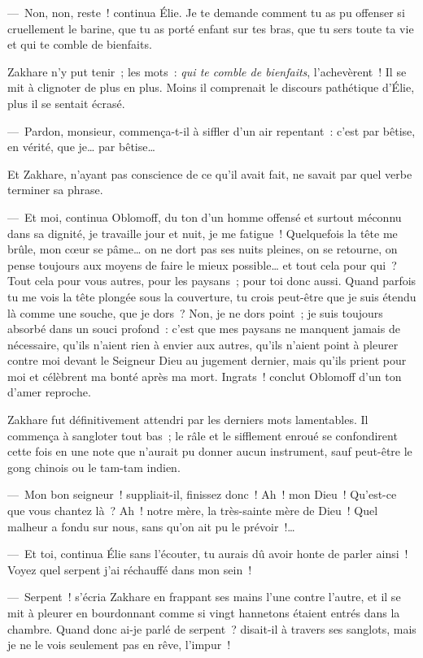 \documentclass[french,twoside]{book} %
\begin{document}
— Non, non, reste ! continua Élie. Je te demande comment tu as pu offenser si cruellement le barine, que tu as porté enfant sur tes bras, que tu sers toute ta vie et qui te comble de bienfaits.\par
Zakhare n’y put tenir ; les mots : \emph{qui te comble de bienfaits}, l’achevèrent ! Il se mit à clignoter de plus en plus. Moins il comprenait le discours pathétique d’Élie, plus il se sentait écrasé.\par
— Pardon, monsieur, commença-t-il à siffler d’un air repentant : c’est par bêtise, en vérité, que je… par bêtise…\par
Et Zakhare, n’ayant pas conscience de ce qu’il avait fait, ne savait par quel verbe terminer sa phrase.\par
— Et moi, continua Oblomoff, du ton d’un homme offensé et surtout méconnu dans sa dignité, je travaille jour et nuit, je me fatigue ! Quelquefois la tête me brûle, mon cœur se pâme… on ne dort pas ses nuits pleines, on se retourne, on pense toujours aux moyens de faire le mieux possible… et tout cela pour qui ? Tout cela pour vous autres, pour les paysans ; pour toi donc aussi. Quand parfois tu me vois la tête plongée sous la couverture, tu crois peut-être que je suis étendu là comme une souche, que je dors ? Non, je ne dors point ; je suis toujours absorbé dans un souci profond : c’est que mes paysans ne manquent jamais de nécessaire, qu’ils n’aient rien à envier aux autres, qu’ils n’aient point à pleurer contre moi devant le Seigneur Dieu au jugement dernier, mais qu’ils prient pour moi et célèbrent ma bonté après ma mort. Ingrats ! conclut Oblomoff d’un ton d’amer reproche.\par
Zakhare fut définitivement attendri par les derniers mots lamentables. Il commença à sangloter tout bas ; le râle et le sifflement enroué se confondirent cette fois en une note que n’aurait pu donner aucun instrument, sauf peut-être le gong chinois ou le tam-tam indien.\par
— Mon bon seigneur ! suppliait-il, finissez donc ! Ah ! mon Dieu ! Qu’est-ce que vous chantez là ? Ah ! notre mère, la très-sainte mère de Dieu ! Quel malheur a fondu sur nous, sans qu’on ait pu le prévoir !…\par
— Et toi, continua Élie sans l’écouter, tu aurais dû avoir honte de parler ainsi ! Voyez quel serpent j’ai réchauffé dans mon sein !\par
— Serpent ! s’écria Zakhare en frappant ses mains l’une contre l’autre, et il se mit à pleurer en bourdonnant comme si vingt hannetons étaient entrés dans la chambre. Quand donc ai-je parlé de serpent ? disait-il à travers ses sanglots, mais je ne le vois seulement pas en rêve, l’impur !\par
\end{document}
